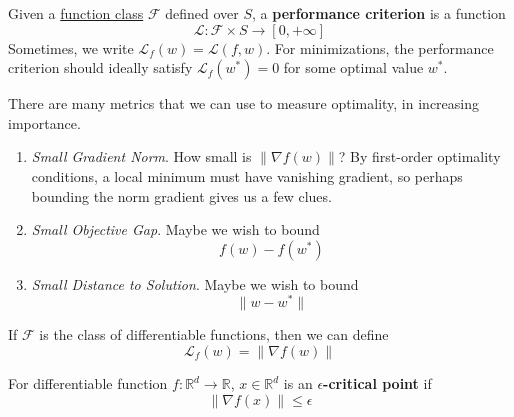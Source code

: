 \begin{definition}
  \label{def:performance-criterion}
	Given a \hyperref[def:function-class]{function class} $\mathcal{F}$ defined over $S$, a \textbf{performance criterion} is a function 
	\begin{equation}
		\mathcal{L}: \mathcal{F} \times S \to [0, +\infty]
	\end{equation}
	Sometimes, we write $\mathcal{L}_f (w) = \mathcal{L}(f, w)$. For minimizations, the performance criterion should ideally satisfy $\mathcal{L}_f (w^\ast) = 0$ for some optimal value $w^\ast$. 
\end{definition}

There are many metrics that we can use to measure optimality, in increasing importance. 

\begin{enumerate}
	\item \textit{Small Gradient Norm}. How small is $\| \nabla f(w)\|$? By first-order optimality conditions, a local minimum must have vanishing gradient, so perhaps bounding the norm gradient gives us a few clues. 

	\item \textit{Small Objective Gap}. Maybe we wish to bound 
		\begin{equation}
			f(w) - f(w^\ast) 
		\end{equation}

	\item \textit{Small Distance to Solution}. Maybe we wish to bound 
		\begin{equation}
			\|w - w^\ast\|
		\end{equation}
\end{enumerate}

\begin{example}
  \label{ex:first-order-stationarity}
	If $\mathcal{F}$ is the class of differentiable functions, then we can define 
	\begin{equation}
		\mathcal{L}_f(w) = \|\nabla f(w)\|
	\end{equation}
\end{example}

\begin{definition}
  \label{def:epsilon-critical-point}
	For differentiable function $f: \mathbb{R}^d \to \mathbb{R}$, $x \in \mathbb{R}^d$ is an \textbf{$\epsilon$-critical point} if 
	\begin{equation}
		\|\nabla f(x)\| \leq \epsilon
	\end{equation}
\end{definition}

